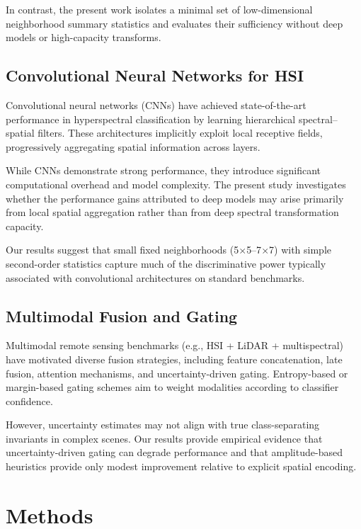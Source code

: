 \documentclass[
  journal]{IEEEtran}
\begin{document}
In contrast, the present work isolates a minimal set of low-dimensional
neighborhood summary statistics and evaluates their sufficiency without
deep models or high-capacity transforms.

\subsection{Convolutional Neural Networks for
HSI}\label{convolutional-neural-networks-for-hsi}

Convolutional neural networks (CNNs) have achieved state-of-the-art
performance in hyperspectral classification by learning hierarchical
spectral--spatial filters. These architectures implicitly exploit local
receptive fields, progressively aggregating spatial information across
layers.

While CNNs demonstrate strong performance, they introduce significant
computational overhead and model complexity. The present study
investigates whether the performance gains attributed to deep models may
arise primarily from local spatial aggregation rather than from deep
spectral transformation capacity.

Our results suggest that small fixed neighborhoods (5\(\times\)5--7\(\times\)7) with
simple second-order statistics capture much of the discriminative power
typically associated with convolutional architectures on standard
benchmarks.

\subsection{Multimodal Fusion and
Gating}\label{multimodal-fusion-and-gating}

Multimodal remote sensing benchmarks (e.g., HSI + LiDAR + multispectral)
have motivated diverse fusion strategies, including feature
concatenation, late fusion, attention mechanisms, and uncertainty-driven
gating. Entropy-based or margin-based gating schemes aim to weight
modalities according to classifier confidence.

However, uncertainty estimates may not align with true class-separating
invariants in complex scenes. Our results provide empirical evidence
that uncertainty-driven gating can degrade performance and that
amplitude-based heuristics provide only modest improvement relative to
explicit spatial encoding.

\section{Methods}\label{methods}
\end{document}
